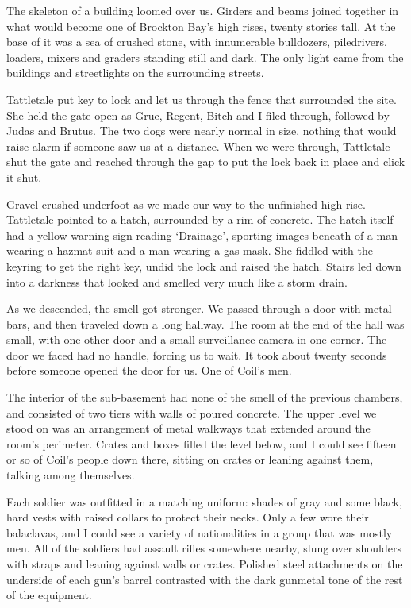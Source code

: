 





The skeleton of a building loomed over us.  Girders and beams joined together in what would become one of Brockton Bay's high rises, twenty stories tall.  At the base of it was a sea of crushed stone, with innumerable bulldozers, piledrivers, loaders, mixers and graders standing still and dark.  The only light came from the buildings and streetlights on the surrounding streets.



Tattletale put key to lock and let us through the fence that surrounded the site.  She held the gate open as Grue, Regent, Bitch and I filed through, followed by Judas and Brutus.  The two dogs were nearly normal in size, nothing that would raise alarm if someone saw us at a distance.  When we were through, Tattletale shut the gate and reached through the gap to put the lock back in place and click it shut.



Gravel crushed underfoot as we made our way to the unfinished high rise.  Tattletale pointed to a hatch, surrounded by a rim of concrete.  The hatch itself had a yellow warning sign reading `Drainage', sporting images beneath of a man wearing a hazmat suit and a man wearing a gas mask.  She fiddled with the keyring to get the right key, undid the lock and raised the hatch.  Stairs led down into a darkness that looked and smelled very much like a storm drain.



As we descended, the smell got stronger.  We passed through a door with metal bars, and then traveled down a long hallway.  The room at the end of the hall was small, with one other door and a small surveillance camera in one corner.  The door we faced had no handle, forcing us to wait.  It took about twenty seconds before someone opened the door for us.  One of Coil's men.



The interior of the sub-basement had none of the smell of the previous chambers, and consisted of two tiers with walls of poured concrete.  The upper level we stood on was an arrangement of metal walkways that extended around the room's perimeter.  Crates and boxes filled the level below, and I could see fifteen or so of Coil's people down there, sitting on crates or leaning against them, talking among themselves.



Each soldier was outfitted in a matching uniform: shades of gray and some black, hard vests with raised collars to protect their necks.  Only a few wore their balaclavas, and I could see a variety of nationalities in a group that was mostly men.  All of the soldiers had assault rifles somewhere nearby, slung over shoulders with straps and leaning against walls or crates.  Polished steel attachments on the underside of each gun's barrel contrasted with the dark gunmetal tone of the rest of the equipment.



